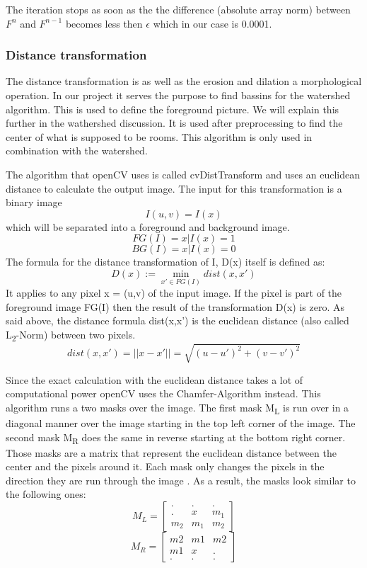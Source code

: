 The iteration stops as soon as the the difference (absolute array norm) between $F^{n}$ and $F^{n-1}$ becomes less then $\epsilon$ which in our case is 0.0001.

\subsubsection{Distance transformation}
\label{subsubsec:Distance transformation}
The distance transformation is as well as the erosion and dilation a morphological operation. In our project it serves the purpose to find bassins for the watershed algorithm. This is used to define the foreground picture. We will explain this further in the wathershed discussion.
It is used after preprocessing to find the center of what is supposed to be rooms. This algorithm is only used in combination with the watershed.

The algorithm that openCV uses is called cvDistTransform and uses an euclidean distance to calculate the output image. The input for this transformation is a binary image \[I(u,v) = I(x)\] which will be separated into a foreground and background image.
\[FG(I) = {x | I(x) = 1}\]
\[BG(I) = {x | I(x) = 0}\]
The formula for the distance transformation of I, D(x) itself is defined as:
\[D(x) :=\min_{x' \in FG(I)} dist(x,x') \]
It applies to any pixel x = (u,v) of the input image. If the pixel is part of the foreground image FG(I) then the result of the transformation D(x) is zero. As said above, the distance formula dist(x,x') is the euclidean distance (also called L\textsubscript{2}-Norm) between two pixels.
\[dist(x,x') = ||x - x'|| = \sqrt{(u - u')^2 + (v - v')^2}\]

Since the exact calculation with the euclidean distance takes a lot of computational power openCV uses the Chamfer-Algorithm instead. This algorithm runs a two masks over the image. The first mask M\textsubscript{L} is run over in a diagonal manner over the image starting in the top left corner of the image. The second mask M\textsubscript{R} does the same in reverse starting at the bottom right corner. Those masks are a matrix that represent the euclidean distance between the center and the pixels around it. Each mask only changes the pixels in the direction they are run through the image \citep{burger_burge_2016}. As a result, the masks look similar to the following ones:
\[M_{L} = \begin{bmatrix} . & . & .\\ . & x & m_1 \\ m_2 & m_1 & m_2 \end{bmatrix}\]
\[M_{R} = \begin{bmatrix} m2 & m1 & m2 \\ m1 & x & . \\ . & . & . \end{bmatrix}\]

